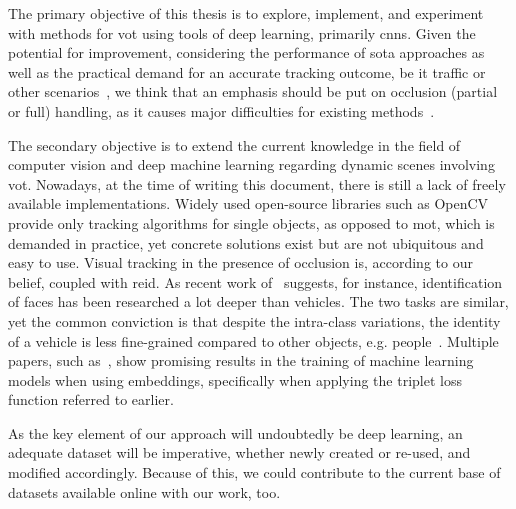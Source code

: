 The primary objective of this thesis is to explore, implement, and experiment with methods for \gls{vot} using tools of deep learning, primarily \glspl{cnn}. Given the potential for improvement, considering the performance of \gls{sota} approaches as well as the practical demand for an accurate tracking outcome, be it traffic or other scenarios~\cite{tang2019cityflow}, we think that an emphasis should be put on occlusion (partial or full) handling, as it causes major difficulties for existing methods~\cite{jiyan2007robustocclusion}.

The secondary objective is to extend the current knowledge in the field of computer vision and deep machine learning regarding dynamic scenes involving \gls{vot}. Nowadays, at the time of writing this document, there is still a lack of freely available implementations. Widely used open-source libraries such as OpenCV~\cite{bradski2000opencv} provide only tracking algorithms for single objects, as opposed to \gls{mot}, which is demanded in practice, yet concrete solutions exist but are not ubiquitous and easy to use. Visual tracking in the presence of occlusion is, according to our belief, coupled with \gls{reid}. As recent work of~\cite{kuma2019vehiclereid} suggests, for instance, identification of faces has been researched a lot deeper than vehicles. The two tasks are similar, yet the common conviction is that despite the intra-class variations, the identity of a vehicle is less fine-grained compared to other objects, e.g. people~\cite{kuma2019vehiclereid}. Multiple papers, such as~\cite{schroff2015facenet, hermans2017triplet}, show promising results in the training of machine learning models when using embeddings, specifically when applying the triplet loss function referred to earlier.

As the key element of our approach will undoubtedly be deep learning, an adequate dataset will be imperative, whether newly created or re-used, and modified accordingly. Because of this, we could contribute to the current base of datasets available online with our work, too.

